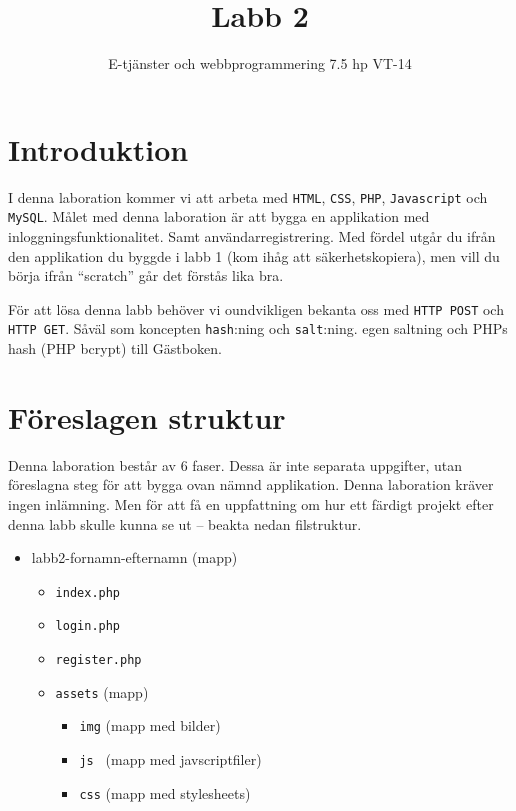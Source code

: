 \documentclass[12pt]{article}
\date{}
\title{ Labb 2 }
\author{ E-tjänster och webbprogrammering 7.5 hp VT-14 }
\begin{document}
\maketitle
\vspace{-2em}



\section{Introduktion}
I denna laboration kommer vi att arbeta med \texttt{HTML}, \texttt{CSS}, \texttt{PHP}, \texttt{Javascript} och \texttt{MySQL}. Målet med denna laboration är att bygga en applikation med inloggningsfunktionalitet. Samt användarregistrering. Med fördel utgår du ifrån den applikation du byggde i labb 1 (kom ihåg att säkerhetskopiera), men vill du börja ifrån ``scratch'' går det förstås lika bra.

För att lösa denna labb behöver vi oundvikligen bekanta oss med \texttt{HTTP POST} och \texttt{HTTP GET}. Såväl som koncepten \texttt{hash}:ning och \texttt{salt}:ning. egen saltning och PHPs hash (PHP bcrypt) till Gästboken.



\section{Föreslagen struktur}
Denna laboration består av 6 faser. Dessa är inte separata uppgifter, utan föreslagna steg för att bygga ovan nämnd applikation. Denna laboration kräver ingen inlämning. Men för att få en uppfattning om hur ett färdigt projekt efter denna labb skulle kunna se ut -- beakta nedan filstruktur.
  \begin{itemize}
    \item labb2-fornamn-efternamn (mapp)
      \begin{itemize}
        \item \texttt{index.php}
        \item \texttt{login.php}
        \item \texttt{register.php}
        \item \texttt{assets} (mapp)
      \begin{itemize}
        \item \texttt{img} (mapp med bilder)
        \item \texttt{js } (mapp med javscriptfiler)
	      \item \texttt{css} (mapp med stylesheets)
      \end{itemize}
    \end{itemize}
  \end{itemize}
\end{document}
